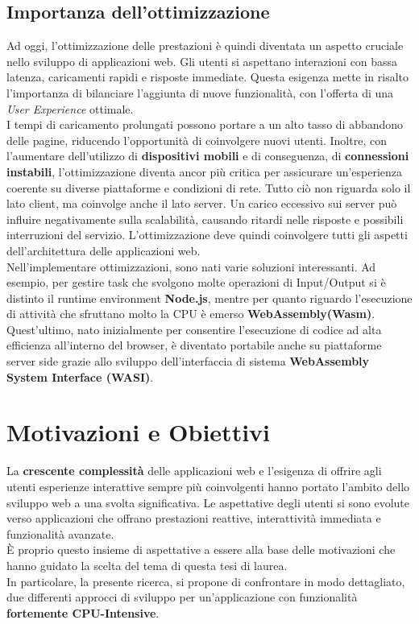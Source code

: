 \subsection{Importanza dell'ottimizzazione}
Ad oggi, l'ottimizzazione delle prestazioni è quindi diventata un aspetto cruciale nello sviluppo di applicazioni web.
Gli utenti si aspettano interazioni con bassa latenza, caricamenti rapidi e risposte immediate.
Questa esigenza mette in risalto l'importanza di bilanciare l'aggiunta di nuove funzionalità, con l'offerta di una \emph{User Experience} ottimale.
\\I tempi di caricamento prolungati possono portare a un alto tasso di abbandono delle pagine, riducendo l'opportunità di coinvolgere nuovi utenti.
Inoltre, con l'aumentare dell'utilizzo di \textbf{dispositivi mobili} e di conseguenza, di \textbf{connessioni instabili}, l'ottimizzazione diventa ancor più critica per assicurare un'esperienza coerente su diverse piattaforme e condizioni di rete.
Tutto ciò non riguarda solo il lato client, ma coinvolge anche il lato server. 
Un carico eccessivo sui server può influire negativamente sulla scalabilità, causando ritardi nelle risposte e possibili interruzioni del servizio.
L'ottimizzazione deve quindi coinvolgere tutti gli aspetti dell'architettura delle applicazioni web.
\\Nell'implementare ottimizzazioni, sono nati varie soluzioni interessanti. 
Ad esempio, per gestire task che svolgono molte operazioni di Input/Output si è distinto il runtime environment \textbf{Node.js}, mentre per quanto riguardo l'esecuzione di attività che sfruttano molto la CPU è emerso \textbf{WebAssembly(Wasm)}.
Quest'ultimo, nato inizialmente per consentire l'esecuzione di codice ad alta efficienza all'interno del browser, è diventato portabile anche su piattaforme server side grazie allo sviluppo dell'interfaccia di sistema \textbf{WebAssembly System Interface (WASI)}.


\section{Motivazioni e Obiettivi}
\label{sec:Obiettivi}
La \textbf{crescente complessità} delle applicazioni web e l'esigenza di offrire agli utenti esperienze interattive sempre più coinvolgenti hanno portato l'ambito dello sviluppo web a una svolta significativa.
Le aspettative degli utenti si sono evolute verso applicazioni che offrano prestazioni reattive, interattività immediata e funzionalità avanzate.
\\È proprio questo insieme di aspettative a essere alla base delle motivazioni che hanno guidato la scelta del tema di questa tesi di laurea.
\\In particolare, la presente ricerca, si propone di confrontare in modo dettagliato, due differenti approcci di sviluppo per un'applicazione con funzionalità \textbf{fortemente CPU-Intensive}.
